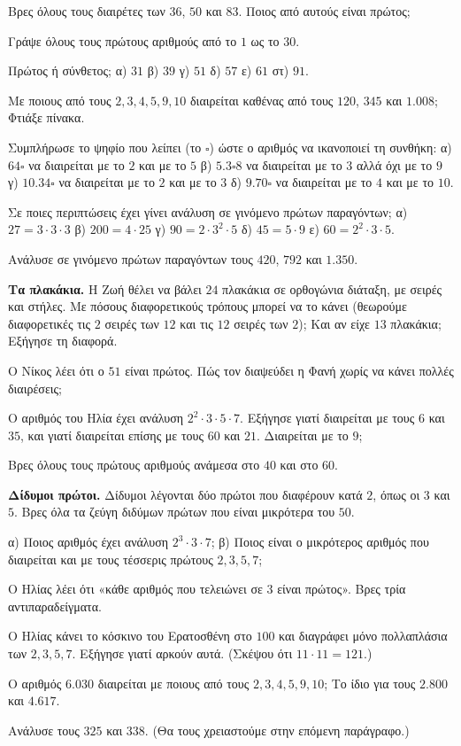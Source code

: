 \ex Βρες όλους τους διαιρέτες των $36$, $50$ και $83$. Ποιος από αυτούς είναι πρώτος;

\ex Γράψε όλους τους πρώτους αριθμούς από το $1$ ως το $30$.

\ex Πρώτος ή σύνθετος; α) $31$ \quad β) $39$ \quad γ) $51$ \quad δ) $57$ \quad ε) $61$ \quad στ) $91$.

\ex Με ποιους από τους $2,3,4,5,9,10$ διαιρείται καθένας από τους $120$, $345$ και $1.008$; Φτιάξε πίνακα.

\ex Συμπλήρωσε το ψηφίο που λείπει (το $\square$) ώστε ο αριθμός να ικανοποιεί τη συνθήκη: α) $64\square$ να διαιρείται με το $2$ και με το $5$ \quad β) $5.3\square 8$ να διαιρείται με το $3$ αλλά όχι με το $9$ \quad γ) $10.34\square$ να διαιρείται με το $2$ και με το $3$ \quad δ) $9.70\square$ να διαιρείται με το $4$ και με το $10$.

\ex Σε ποιες περιπτώσεις έχει γίνει ανάλυση σε γινόμενο πρώτων παραγόντων; α) $27=3\cdot 3\cdot 3$ \quad β) $200=4\cdot 25$ \quad γ) $90=2\cdot 3^2\cdot 5$ \quad δ) $45=5\cdot 9$ \quad ε) $60=2^2\cdot 3\cdot 5$.


\ex Ανάλυσε σε γινόμενο πρώτων παραγόντων τους $420$, $792$ και $1.350$.

\ex \textbf{Τα πλακάκια.} Η Ζωή θέλει να βάλει $24$ πλακάκια σε ορθογώνια διάταξη, με σειρές και στήλες. Με πόσους διαφορετικούς τρόπους μπορεί να το κάνει (θεωρούμε διαφορετικές τις $2$ σειρές των $12$ και τις $12$ σειρές των $2$); Και αν είχε $13$ πλακάκια; Εξήγησε τη διαφορά.

\ex Ο Νίκος λέει ότι ο $51$ είναι πρώτος. Πώς τον διαψεύδει η Φανή χωρίς να κάνει πολλές διαιρέσεις;

\ex Ο αριθμός του Ηλία έχει ανάλυση $2^2\cdot 3\cdot 5\cdot 7$. Εξήγησε γιατί διαιρείται με τους $6$ και $35$, και γιατί διαιρείται επίσης με τους $60$ και $21$. Διαιρείται με το $9$;

\ex Βρες όλους τους πρώτους αριθμούς ανάμεσα στο $40$ και στο $60$.


\ex \textbf{Δίδυμοι πρώτοι.} Δίδυμοι λέγονται δύο πρώτοι που διαφέρουν κατά $2$, όπως οι $3$ και $5$. Βρες όλα τα ζεύγη διδύμων πρώτων που είναι μικρότερα του $50$.

\ex α) Ποιος αριθμός έχει ανάλυση $2^3\cdot 3\cdot 7$; β) Ποιος είναι ο μικρότερος αριθμός που διαιρείται και με τους τέσσερις πρώτους $2,3,5,7$;

\ex Ο Ηλίας λέει ότι «κάθε αριθμός που τελειώνει σε $3$ είναι πρώτος». Βρες τρία αντιπαραδείγματα.

\ex Ο Ηλίας κάνει το κόσκινο του Ερατοσθένη στο $100$ και διαγράφει μόνο πολλαπλάσια των $2,3,5,7$. Εξήγησε γιατί αρκούν αυτά. (Σκέψου ότι $11\cdot 11=121$.)


\ex Ο αριθμός $6.030$ διαιρείται με ποιους από τους $2,3,4,5,9,10$; Το ίδιο για τους $2.800$ και $4.617$.

\ex Ανάλυσε τους $325$ και $338$. (Θα τους χρειαστούμε στην επόμενη παράγραφο.)
